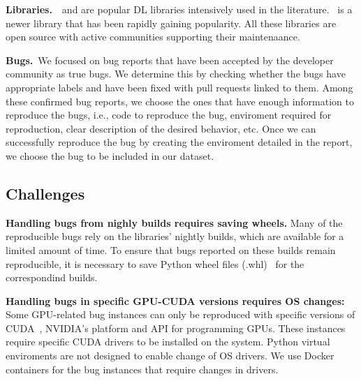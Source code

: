 \documentclass[sigconf,screen]{acmart}
\begin{document}

\textbf{Libraries.}~\torch~and \tf are popular DL libraries
intensively used in the literature. \jax\ is a newer library that has
been rapidly gaining popularity. All these libraries are open source
with active communities supporting their maintenaance.



\textbf{Bugs.}~We focused on bug reports that have been accepted by
the developer community as true bugs. We determine this by checking
whether the bugs have appropriate labels and have been fixed with pull
requests linked to them. Among these confirmed bug reports, we choose
the ones that have enough information to reproduce the bugs, i.e.,
code to reproduce the bug, enviroment required for
reproduction, clear description of the desired behavior,
etc. Once we can successfully reproduce the bug by creating the
enviroment detailed in the report, we choose the bug to be included in
our dataset.

\subsection{Challenges}
\label{sec:challenges}

\textbf{Handling bugs from nighly builds requires saving wheels.}
Many of the reproducible bugs rely on the libraries' nightly builds,
which are available for a limited amount of time. To ensure that bugs
reported on these builds remain reproducible, it is necessary to save
Python wheel files (.whl)~\cite{wheels} for the correspondind builds.

\textbf{Handling bugs in specific GPU-CUDA versions requires OS
  changes:} Some GPU-related bug instances can only be reproduced with
specific versions of CUDA~\cite{cuda}, NVIDIA's platform and API for
programming GPUs. These instances require specific CUDA drivers to be
installed on the system. Python virtual enviroments are not designed
to enable change of OS drivers.
We use Docker containers for the bug instances that require changes in
drivers.
\end{document}
